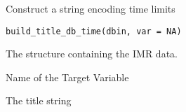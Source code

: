 %
\begin{Description}\relax
Construct a string encoding time limits
\end{Description}
%
\begin{Usage}
\begin{verbatim}
build_title_db_time(dbin, var = NA)
\end{verbatim}
\end{Usage}
%
\begin{Arguments}
\begin{ldescription}
\item[\code{dbin}] 
The  structure containing the IMR data. 

\item[\code{var}] 
Name of the Target Variable

\end{ldescription}
\end{Arguments}
%
\begin{Value}
The title string
\end{Value}
